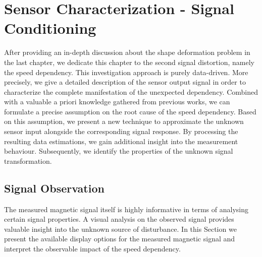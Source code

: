 \documentclass[english]{isasthesis}
\begin{document}
   	\chapter{Sensor Characterization - Signal Conditioning} \label{signal conditioning}
   	After providing an in-depth discussion about the shape deformation problem in the last chapter, we dedicate this chapter to the second signal distortion, namely the speed dependency. This investigation approach is purely data-driven. More precisely, we give a detailed description of the sensor output signal in order to characterize the complete manifestation of the unexpected dependency. Combined with a valuable a priori knowledge gathered from previous works, we can formulate a precise assumption on the root cause of the speed dependency. Based on this assumption, we present a new technique to approximate the unknown sensor input alongside the corresponding signal response. By processing the resulting data estimations, we gain additional insight into the measurement behaviour. Subsequently, we identify the properties of the unknown signal transformation.
 
    \section{Signal Observation} \label{signal observation}
    The measured magnetic signal itself is highly informative in terms of analysing certain signal properties. A visual analysis on the observed signal provides valuable insight into the unknown source of disturbance. In this Section we present the available display options for the measured magnetic signal and interpret the observable impact of the speed dependency.
\end{document}
